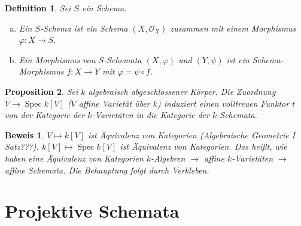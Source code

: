 \documentclass[a4paper,oneside]{scrbook}
\theoremstyle{break}
\newtheorem{Def}{Definition}[section]
\newtheorem{Prop}[Def]{Proposition}
\theoremstyle{nonumberbreak}
\theoremstyle{nonumberplain}
\newtheorem{Bew}{Beweis}
\theoremstyle{break}
\newcommand{\Spec}{%
	\ensuremath{\operatorname{Spec}}%
}
\begin{document}
\begin{Def}
	Sei $S$ ein Schema.
	\begin{enumerate}[(a)]
		\item Ein $S$-Schema ist ein Schema $(X,\mathcal{O}_X)$ zusammen mit einem Morphismus $\varphi: X \rightarrow S$.
		\item Ein Morphismus von $S$-Schemata $(X,\varphi)$ und $(Y,\psi)$ ist ein Schema-Morphismus $f: X  \rightarrow Y$ mit $\varphi = \psi \circ f$.
\begin{center}
	\end{center}

	\end{enumerate}
\end{Def}

\begin{Prop}
	\label{faithful_functor_k-variety_k-scheme}
	Sei $k$ algebraisch abgeschlossener Körper. Die Zuordnung $V \rightarrow \Spec k[V]$ ($V$ affine Varietät über $k$) induziert einen volltreuen Funktor $t$ von der Kategorie der $k$-Varietäten in die Kategorie der $k$-Schemata.
\end{Prop}
\begin{Bew}
	$V \mapsto k[V]$ ist Äquivalenz von Kategorien (Algebraische Geometrie I Satz???). $k[V] \mapsto \Spec k[V]$ ist Äquivalenz von Kategorien. Das heißt, wie haben eine Äquivalenz von Kategorien $k$-Algebren $\rightarrow$ affine $k$-Varietäten $\rightarrow$ affine Schemata. Die Behauptung folgt durch Verkleben.
\end{Bew}

\section{Projektive Schemata}
\end{document}

